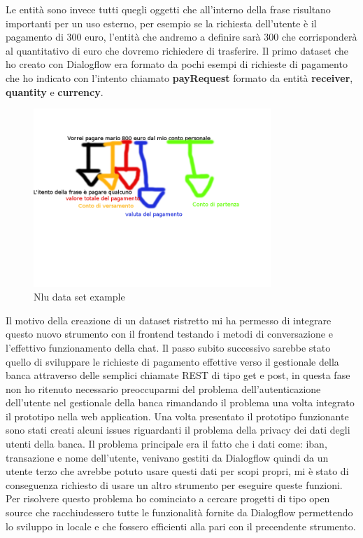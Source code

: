 Le entità sono invece tutti quegli oggetti che all'interno della frase risultano importanti per un uso esterno, per esempio se la richiesta dell'utente è il pagamento di 300 euro, l'entità che andremo a definire sarà 300 che corrisponderà al quantitativo di euro che dovremo richiedere di trasferire.
Il primo dataset che ho creato con Dialogflow era formato da pochi esempi di richieste di pagamento che ho indicato con l'intento chiamato \textbf{payRequest} formato da entità \textbf{receiver}, \textbf{quantity} e \textbf{currency}.
\begin{figure}[H]
 \centering
  \includegraphics[width=0.8\textwidth]{img/nludatasetexample.png}
 \caption{Nlu data set example}
\end{figure}
Il motivo della creazione di un dataset ristretto mi ha permesso di integrare questo nuovo strumento con il frontend testando i metodi di conversazione e l'effettivo funzionamento della chat.
Il passo subito successivo sarebbe stato quello di sviluppare le richieste di pagamento effettive verso il gestionale della banca attraverso delle semplici chiamate REST di tipo get e post, in questa fase non ho ritenuto necessario preoccuparmi del problema dell'autenticazione dell'utente nel gestionale della banca rimandando il problema una volta integrato il prototipo nella web application.
Una volta presentato il prototipo funzionante sono stati creati alcuni issues riguardanti il problema della privacy dei dati degli utenti della banca.
Il problema principale era il fatto che i dati come: iban, transazione e nome dell'utente, venivano gestiti da Dialogflow quindi da un utente terzo che avrebbe potuto usare questi dati per scopi propri, mi è stato di conseguenza richiesto di usare un altro strumento per eseguire queste funzioni.
Per risolvere questo problema ho cominciato a cercare progetti di tipo open source che racchiudessero tutte le funzionalità fornite da Dialogflow permettendo lo sviluppo in locale e che fossero efficienti alla pari con il precendente strumento.
